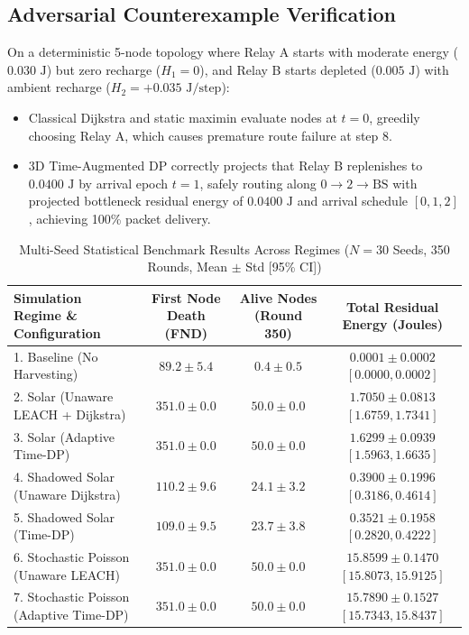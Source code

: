 \documentclass[conference]{IEEEtran}
\begin{document}
\subsection{Adversarial Counterexample Verification}
On a deterministic 5-node topology where Relay A starts with moderate energy ($0.030\text{ J}$) but zero recharge ($H_1 = 0$), and Relay B starts depleted ($0.005\text{ J}$) with ambient recharge ($H_2 = +0.035\text{ J/step}$):
\begin{itemize}
    \item Classical Dijkstra and static maximin evaluate nodes at $t=0$, greedily choosing Relay A, which causes premature route failure at step 8.
    \item 3D Time-Augmented DP correctly projects that Relay B replenishes to $0.0400\text{ J}$ by arrival epoch $t=1$, safely routing along $0 \to 2 \to \text{BS}$ with projected bottleneck residual energy of $0.0400\text{ J}$ and arrival schedule $[0, 1, 2]$, achieving 100\% packet delivery.
\end{itemize}

\begin{table}[!t]
\caption{Multi-Seed Statistical Benchmark Results Across Regimes ($N = 30$ Seeds, 350 Rounds, Mean $\pm$ Std [95\% CI])}
\label{tab:multi_seed}
\centering
\begin{tabular}{@{}lccc@{}}
\toprule
\textbf{Simulation Regime \& Configuration} & \textbf{First Node Death (FND)} & \textbf{Alive Nodes (Round 350)} & \textbf{Total Residual Energy (Joules)} \\
\midrule
1. Baseline (No Harvesting) & $89.2 \pm 5.4$ & $0.4 \pm 0.5$ & $0.0001 \pm 0.0002$ $[0.0000, 0.0002]$ \\
2. Solar (Unaware LEACH + Dijkstra) & $351.0 \pm 0.0$ & $50.0 \pm 0.0$ & $\mathbf{1.7050 \pm 0.0813}$ $[1.6759, 1.7341]$ \\
3. Solar (Adaptive Time-DP) & $351.0 \pm 0.0$ & $50.0 \pm 0.0$ & $1.6299 \pm 0.0939$ $[1.5963, 1.6635]$ \\
4. Shadowed Solar (Unaware Dijkstra) & $\mathbf{110.2 \pm 9.6}$ & $\mathbf{24.1 \pm 3.2}$ & $\mathbf{0.3900 \pm 0.1996}$ $[0.3186, 0.4614]$ \\
5. Shadowed Solar (Time-DP) & $109.0 \pm 9.5$ & $23.7 \pm 3.8$ & $0.3521 \pm 0.1958$ $[0.2820, 0.4222]$ \\
6. Stochastic Poisson (Unaware LEACH) & $351.0 \pm 0.0$ & $50.0 \pm 0.0$ & $\mathbf{15.8599 \pm 0.1470}$ $[15.8073, 15.9125]$ \\
7. Stochastic Poisson (Adaptive Time-DP) & $351.0 \pm 0.0$ & $50.0 \pm 0.0$ & $15.7890 \pm 0.1527$ $[15.7343, 15.8437]$ \\
\bottomrule
\end{tabular}
\end{table}
\end{document}
